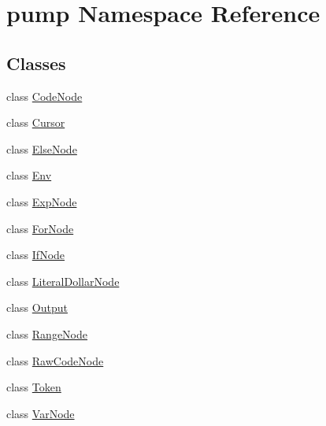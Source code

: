 \hypertarget{namespacepump}{}\section{pump Namespace Reference}
\label{namespacepump}
\subsection*{Classes}
\begin{DoxyCompactItemize}
\item 
class \hyperlink{classpump_1_1CodeNode}{Code\+Node}
\item 
class \hyperlink{classpump_1_1Cursor}{Cursor}
\item 
class \hyperlink{classpump_1_1ElseNode}{Else\+Node}
\item 
class \hyperlink{classpump_1_1Env}{Env}
\item 
class \hyperlink{classpump_1_1ExpNode}{Exp\+Node}
\item 
class \hyperlink{classpump_1_1ForNode}{For\+Node}
\item 
class \hyperlink{classpump_1_1IfNode}{If\+Node}
\item 
class \hyperlink{classpump_1_1LiteralDollarNode}{Literal\+Dollar\+Node}
\item 
class \hyperlink{classpump_1_1Output}{Output}
\item 
class \hyperlink{classpump_1_1RangeNode}{Range\+Node}
\item 
class \hyperlink{classpump_1_1RawCodeNode}{Raw\+Code\+Node}
\item 
class \hyperlink{classpump_1_1Token}{Token}
\item 
class \hyperlink{classpump_1_1VarNode}{Var\+Node}
\end{DoxyCompactItemize}
